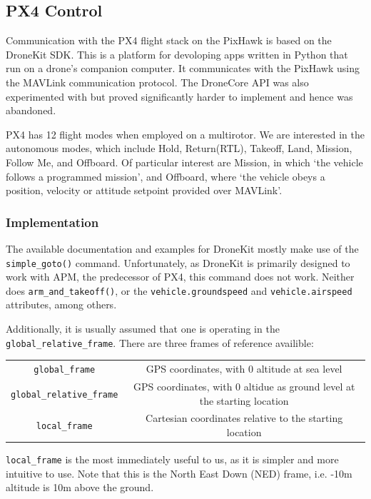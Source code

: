 \documentclass[10pt]{article}
\begin{document}
\subsection{PX4 Control}
Communication with the PX4 flight stack on the PixHawk is based on the DroneKit SDK. This is a platform for devoloping apps written in Python that run on a drone's companion computer. It communicates with the PixHawk using the MAVLink communication protocol.\cite{dronekit} The DroneCore API was also experimented with but proved significantly harder to implement and hence was abandoned.

PX4 has 12 flight modes when employed on a multirotor. We are interested in the autonomous modes, which include Hold, Return(RTL), Takeoff, Land, Mission, Follow Me, and Offboard. Of particular interest are Mission, in which `the vehicle follows a programmed mission', and Offboard, where `the vehicle obeys a position, velocity or attitude setpoint provided over MAVLink'.\cite{PX4_user_guide}

\subsubsection{Implementation}
The available documentation and examples for DroneKit mostly make use of the \lstinline[language=Python]|simple_goto()| command. Unfortunately, as DroneKit is primarily designed to work with APM, the predecessor of PX4, this command does not work. Neither does \lstinline[language=Python]|arm_and_takeoff()|, or the \lstinline|vehicle.groundspeed| and \lstinline|vehicle.airspeed| attributes, among others.

Additionally, it is usually assumed that one is operating in the \lstinline|global_relative_frame|. There are three frames of reference availible:
\begin{center}
\begin{tabular}{cc}
    \lstinline|global_frame| & GPS coordinates, with 0 altitude at sea level \\
    \lstinline|global_relative_frame| & GPS coordinates, with 0 altidue as ground level at the starting location \\
    \lstinline|local_frame| & Cartesian coordinates relative to the starting location
\end{tabular}
\end{center}
\lstinline|local_frame| is the most immediately useful to us, as it is simpler and more intuitive to use. Note that this is the North East Down (NED) frame, i.e. -10m altitude is 10m above the ground.
\end{document}
